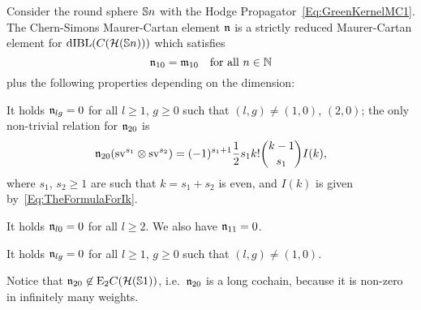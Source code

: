 \documentclass[\MainFolder/Text.tex]{subfiles}
\begin{document}
\begin{Proposition} \label{Proposition:MCSphere}
Consider the round sphere $\mathbb{S}{n}$ with the Hodge Propagator~\eqref{Eq:GreenKernelMC1}. The Chern-Simons Maurer-Cartan element $\mathfrak{n}$ is a strictly reduced Maurer-Cartan element for $\mathrm{dIBL}(C(\mathcal{H}(\mathbb{S}{n})))$ which satisfies
$$ \mathfrak{n}_{10} = \mathfrak{m}_{10}\quad\text{for all }n\in \mathbb{N}$$
plus the following properties depending on the dimension:
\begin{description}[font=\normalfont\itshape]
 \item[($n = 1$):] It holds $\mathfrak{n}_{lg}=0$ for all $l\ge 1$, $g\ge 0$ such that $(l,g) \neq (1,0)$, $(2,0)$; the only non-trivial relation for $\mathfrak{n}_{20}$ is
  \begin{equation}\label{Eq:MC20}
  \mathfrak{n}_{20}(\mathrm{s} \mathrm{v}^{s_1}\otimes  \mathrm{s} \mathrm{v}^{s_2}) = (-1)^{s_1+1} \frac{1}{2} s_1 k! \binom{k-1}{s_1} I(k),
  \end{equation}
  where $s_1$, $s_2\ge 1$ are such that $k = s_1 + s_2$ is even, and $I(k)$ is given by~\eqref{Eq:TheFormulaForIk}.
 \item[($n=2$):] It holds $\mathfrak{n}_{l0}=0$ for all $l\ge 2$. We also have $\mathfrak{n}_{11}=0$.
 \item[($n\ge 3$):] It holds $\mathfrak{n}_{lg} = 0$ for all $l\ge 1$, $g\ge 0$ such that $(l,g) \neq (1,0)$.
\end{description}
\end{Proposition}

Notice that $\mathfrak{n}_{20}\not\in \mathrm{E}_2 C(\mathcal{H}(\mathbb{S}{1}))$, i.e.~$\mathfrak{n}_{20}$ is a long cochain, because it is non-zero in infinitely many weights.
\end{document}
